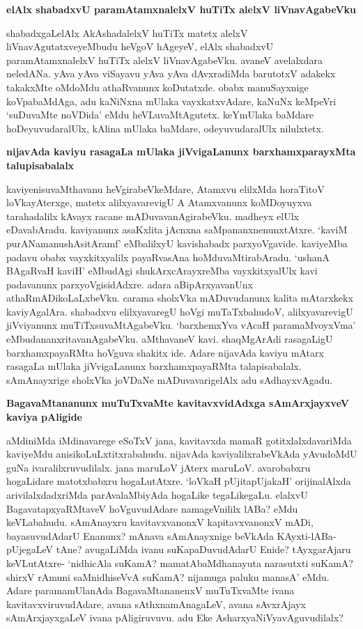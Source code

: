 {\bigskip
\noindent
{\large\bf elAlx shabadxvU paramAtamxnalelxV huTiTx alelxV liVnavAgabeVku}}\label{page182}
\medskip

\noindent
shabadxgaLelAlx AkAshadalelxV huTiTx matetx alelxV liVnavAgutatxveyeMbudu heVgoV hAgeyeV, elAlx shabadx\-vU paramAtamxnalelxV huTiTx alelxV liVnavAgabeVku. avaneV avelalxdara neledANa. yAva yAva viSa\-yavu yAva yAva dAvxradiMda barutotxV adakekx takakxMte oMdoMdu athaRvanunx koDutatxde. obabx manuSayx\-nige koVpabaMdAga, adu kaNiNxna mUlaka vayxkatxvAdare, kaNuNx keMpeVri `suDuvaMte noVDida' eMdu heVLu\-vaMtAgutetx. keYmUlaka baMdare hoDeyuvudaralUlx, kAlina mUlaka baMdare, odeyuvuda\-ralUlx nilulxtetx. 

{\bigskip
\noindent
{\large\bf nijavAda kaviyu rasagaLa mUlaka jiVvigaLanunx barxhamxparayxMta talupisabalalx}}\label{page183}
\medskip

\noindent
kaviyenisuvaMthavanu heVgirabeVkeMdare, Atamxvu elilxMda horaTitoV loVka\-yAterxge, matetx alilxya\-varevigU A Atamxvanunx koMDoyuyxva tarahadalilx kAvayx racane mADuvavanAgirabeVku. madheyx elUlx eDava\-bAradu. kaviyanunx asaKxlita jAcnxna saMpananxnenunxtAtxre. `kaviM purANamanushAsitAramf'\label{239} eMba\-lilxyU kavishabadx parxyoVgavide. kaviyeMba padavu obabx vayxkitxyalilx payaRvasAna hoMduvaMtirabA\-radu. `ushanA BAgaRvaH kaviH' eMbudAgi shukArxcArayxreMba vayxkitxyalUlx kavi padavanunx parxyoVgisidAdxre. adara aBipArxyavanUnx athaRmADikoLaLxbeVku. carama sholxVka mADuvudanunx kalita mAtarxkekx kaviyAga\-lAra. shabadxvu elilxyavaregU hoVgi muTaTxbahudoV, alilxyavarevigU jiVviyanunx muTiTxsuvaMtAga\-beVku. `barxhemxYva vAcaH paramaMvoyxVma'\label{183} eMbudananxritavanAgabeVku. aMthavaneV kavi. shaqMgA\-rAdi rasa\-gaLigU barxhamxpayaRMta hoVguva shakitx ide. Adare nijavAda kaviyu mAtarx rasagaLa mUlaka jiVvigaLanunx barxhamxpayaRMta talapisabalalx. sAmAnayxrige sholxVka joVDaNe mADuvavarigelAlx adu sAdhayxvAgadu.

\newpage

{\bigskip
\noindent
{\large\bf BagavaMtananunx muTuTxvaMte kavitavxvidAdxga sAmArxjayxveV kaviya pAligide}}\label{page183}
\medskip

\noindent
aMdiniMda iMdinavarege eSoTxV jana, kavitavxda mamaR gotitxlalxdavariMda kaviyeMdu anisikoLuLx\-titxrabahudu. nijavAda kaviyalilxrabeVkAda yAvudoMdU guNa ivaralilxruvudilalx. jana maruLoV jAterx maruLoV. avarobabxru hogaLidare matotxbabxru hogaLutAtxre. `loVkaH pUjitapUjakaH'\label{183} oriji\-nalAlxda arivilalxdadxriMda parAvalaMbiyAda hogaLike tegaLikegaLu. elalxvU BagavatapxyaRMtaveV hoVgu\-vudAdare namageVnililx lABa? eMdu keVLabahudu. sAmAnayxru kavitavxvanonxV kapitavxvanonxV mADi, bayasuvudAdarU Enanunx? mAnava sAmAnayxnige beVkAda KAyxti-lABa-pUjegaLeV tAne? avu\-gaLiMda ivanu suKapaDuvudAdarU Enide? tAyxgarAjaru keVLutAtxre- `nidhicAla suKamA? mamatA\-baMdhanayuta narasutxti suKamA? shirxV rAmuni saMnidhiseVvA suKamA? nijamuga paluku manasA' eMdu. Adare paramamUlanAda BagavaMtananenxV muTuTxvaMte ivana kavitavxviruvudAdare, avana sAthxna\-mAnagaLeV, avana sAvxrAjayx sAmArxjayxgaLeV ivana pAligiruvuvu. adu Eke AsharxyaNiVyavAguvudilalx?

